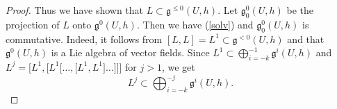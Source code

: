 \begin{proof}
Thus we have shown that $L\subset\mathfrak{g}^{\le 0}(U,h)$. Let $\mathfrak{g}^{0}_0(U,h)$ be the projection of $L$ onto $\mathfrak{g}^{0}(U,h)$. Then we have (\ref{solv}) and $\mathfrak{g}^{0}_0(U,h)$ is commutative.
Indeed, it follows from $[L,L]=L^1\subset\mathfrak{g}^{< 0}(U,h)$ and that $\mathfrak{g}^{0}(U,h)$ is a Lie algebra of vector fields. Since $L^1\subset \bigoplus_{i=-k}^{-1}\mathfrak{g}^i(U,h)$ and $L^j=\big[L^1,\big[L^1\big[\dots,\big[L^1,L^1\big]\dots\big]\big]\big]$ for $j>1$, we get
\[L^j\subset \bigoplus_{i=-k}^{-j}\mathfrak{g}^i(U,h) .\tag*{\qed}\]
\renewcommand{\qed}{}
\end{proof}
